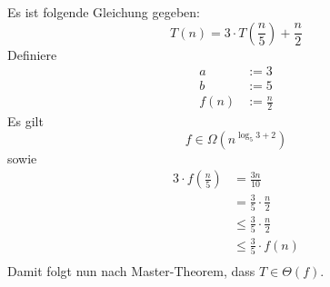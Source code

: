 \begin{example}
	Es ist folgende Gleichung gegeben:
	\begin{equation*}
		T(n) = 3 \cdot T(\frac{n}{5}) + \frac{n}{2}
	\end{equation*}
	Definiere
	\begin{align*}
		a & := 3 \\
		b & := 5 \\
		f(n) & := \frac{n}{2}
	\end{align*}
	Es gilt
	\[
		f \in \Omega(n^{\log_5{3+2}})
	\]
	sowie
	\begin{align*}
		3 \cdot f(\frac{n}{5})
		& = \frac{3n}{10} \\
		& = \frac{3}{5} \cdot \frac{n}{2} \\
		& \leq \frac{3}{5} \cdot \frac{n}{2} \\
		& \leq \frac{3}{5} \cdot f(n) \\
	\end{align*}
	Damit folgt nun nach Master-Theorem, dass $T \in \Theta(f)$.
\end{example}
